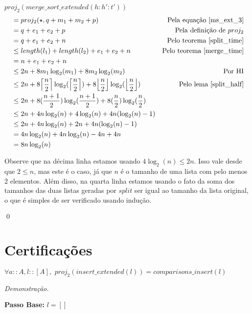 \documentclass[12pt, oneside, a4paper,english,brazil]{abntex2}
\DeclarePairedDelimiter\floor{\lfloor}{\rfloor}
\DeclarePairedDelimiter\ceil{\lceil}{\rceil}
\begin{document}
$proj_{2}(merge\_sort\_extended(h : h' : t'))$
\begin{align*}
  &= proj_{2}(\star, q + m_{1} + m_{2} + p) &\text{Pela equa\c{c}\~ao \ref{ms_ext_3}}\\
  &= q + e_{1} + e_{2} + p &\text{Pela defini\c{c}\~ao de $proj_{2}$}\\
  &= q + e_{1} + e_{2} + n &\text{Pelo teorema \ref{split_time}}\\
  &\le length(l_{1}) + length(l_{2}) + e_{1} + e_{2} + n &\text{Pelo teorema \ref{merge_time}}\\
  &= n + e_{1} + e_{2} + n\\
  &\le 2n + 8m_{1}\log_{2}(m_{1}) + 8m_{2}\log_{2}(m_{2}) &\text{Por HI}\\
  &\le 2n + 8\ceil*{\frac{n}{2}}\log_{2}(\ceil*{\frac{n}{2}}) + 8\floor*{\frac{n}{2}}\log_{2}(\floor*{\frac{n}{2}}) &\text{Pelo lema \ref{split_half}}\\
  &\le 2n + 8(\frac{n + 1}{2})\log_{2}(\frac{n + 1}{2}) + 8(\frac{n}{2})\log_{2}(\frac{n}{2}) \\
  &\le 2n + 4n\log_{2}(n) + 4\log_{2}(n) + 4n(\log_{2}(n) - 1)\\
  &\le 2n + 4n\log_{2}(n) + 2n + 4n(\log_{2}(n) - 1)\\
  &= 4n\log_{2}(n) + 4n\log_{2}(n) - 4n + 4n\\
  &= 8n\log_{2}(n)
\end{align*}

Observe que na d\'ecima linha estamos usando $4\log_{2}(n) \le 2n$. Isso vale desde que $2 \le n$, mas este \'e o caso, j\'a que $n$ \'e o tamanho de uma lista com pelo menos 2 elementos. Al\'em disso, na quarta linha estamos usando o fato da soma dos tamanhos das duas listas geradas por $split$ ser igual ao tamanho da lista original, o que \'e simples de ser verificado usando indu\c{c}\~ao.

\qed

\section{Certifica\c{c}\~oes}

\begin{teorema}
  $\forall a :: A, l :: [A], \,\, proj_{2}(insert\_extended(l)) = comparisons\_insert(l)$
\end{teorema}

\noindent \textit{Demonstra\c{c}\~ao.}

\textbf{Passo Base: } $l = []$
\end{document}

